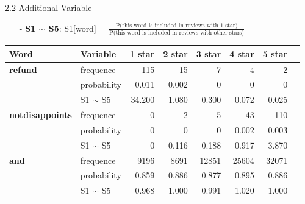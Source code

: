 \documentclass[10pt]{beamer}
\begin{document}
\begin{frame}{2.2 Additional Variable}

\begin{itemize}
	\item[-] \textbf{S1 $\sim$ S5}: S1[word] = $\frac{\text{P(this word is included in reviews with 1 star)}}{\text{P(this word is included in reviews with other stars)}}$
\end{itemize}

\begin{table}[ht]

\centering %
\begin{tabular}{l l r r r r r r} %
\hline %
Word   &Variable  & 1 star & 2 star & 3 star & 4 star & 5 star  \\ [0.5ex] %
\hline %
\textbf{refund}         & frequence   & 115    & 15     & 7      & 4      & 2      \\
                 & probability & 0.011  & 0.002  & 0      & 0      & 0      \\
                  & S1 $\sim$ S5     & 34.200 & 1.080  & 0.300  & 0.072  & 0.025  \\
\hline
\textbf{notdisappoints} & frequence   & 0      & 2      & 5      & 43     & 110   \\
                    & probability & 0      & 0      & 0      & 0.002  & 0.003  \\
                    & S1 $\sim$ S5     & 0      & 0.116  & 0.188  & 0.917  & 3.870  \\
 \hline
 \textbf{and}            & frequence   & 9196   & 8691   & 12851  & 25604  & 32071  \\
                    & probability & 0.859  & 0.886  & 0.877  & 0.895  & 0.886  \\
                    & S1 $\sim$ S5     & 0.968  & 1.000  & 0.991  & 1.020  & 1.000  \\

\hline %
\end{tabular}
\label{table:nonlin} %
\end{table}

\end{frame}
\end{document}
